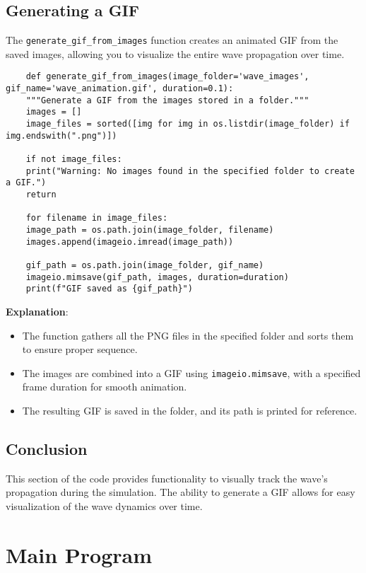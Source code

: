 \documentclass[a4paper, 11pt]{article}
\begin{document}
\subsection{Generating a GIF}

The \texttt{generate\_gif\_from\_images} function creates an animated GIF from the saved images, allowing you to visualize the entire wave propagation over time.

\lstset{language=Python}
\begin{lstlisting}
	def generate_gif_from_images(image_folder='wave_images', gif_name='wave_animation.gif', duration=0.1):
	"""Generate a GIF from the images stored in a folder."""
	images = []
	image_files = sorted([img for img in os.listdir(image_folder) if img.endswith(".png")])
	
	if not image_files:
	print("Warning: No images found in the specified folder to create a GIF.")
	return
	
	for filename in image_files:
	image_path = os.path.join(image_folder, filename)
	images.append(imageio.imread(image_path))
	
	gif_path = os.path.join(image_folder, gif_name)
	imageio.mimsave(gif_path, images, duration=duration)
	print(f"GIF saved as {gif_path}")
\end{lstlisting}

\textbf{Explanation}:
\begin{itemize}
	\item The function gathers all the PNG files in the specified folder and sorts them to ensure proper sequence.
	\item The images are combined into a GIF using \texttt{imageio.mimsave}, with a specified frame duration for smooth animation.
	\item The resulting GIF is saved in the folder, and its path is printed for reference.
\end{itemize}

\subsection{Conclusion}

This section of the code provides functionality to visually track the wave's propagation during the simulation. The ability to generate a GIF allows for easy visualization of the wave dynamics over time.

\section{Main Program}
\end{document}
